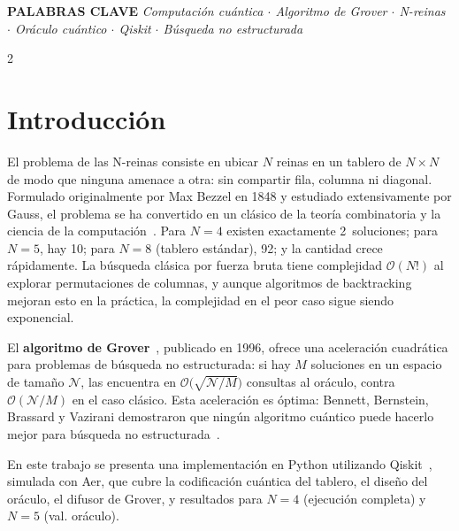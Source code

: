 \documentclass[9pt, a4paper]{extarticle}
\newcommand{\BigO}{\mathcal{O}}
\begin{document}
\vspace{0.01cm}
\noindent
\colorbox{boxbg}{%
\begin{minipage}{\dimexpr\textwidth-2\fboxsep\relax}
\vspace{2pt}
{\small\sffamily\bfseries\color{accent} PALABRAS CLAVE}\quad
{\small\itshape
Computaci\'on cu\'antica $\cdot$ Algoritmo de Grover $\cdot$ N-reinas $\cdot$
Or\'aculo cu\'antico $\cdot$ Qiskit $\cdot$ B\'usqueda no estructurada}
\vspace{2pt}
\end{minipage}}

\vspace{0.07cm}

\begin{multicols}{2}
\raggedcolumns

\section{Introducci\'on}

El problema de las N-reinas consiste en ubicar $N$ reinas en un tablero
de $N \times N$ de modo que ninguna amenace a otra: sin compartir fila,
columna ni diagonal. Formulado originalmente por Max Bezzel en 1848 y
estudiado extensivamente por Gauss, el problema se ha convertido en un
cl\'asico de la teor\'ia combinatoria y la ciencia de la
computaci\'on~\cite{nqueens}.
Para $N = 4$ existen exactamente 2~soluciones; para $N = 5$, hay 10;
para $N = 8$ (tablero est\'andar), 92; y la cantidad crece r\'apidamente.
La b\'usqueda cl\'asica por fuerza bruta tiene complejidad $\BigO(N!)$
al explorar permutaciones de columnas, y aunque algoritmos de backtracking
mejoran esto en la pr\'actica, la complejidad en el peor caso sigue siendo
exponencial.

El \textbf{algoritmo de Grover}~\cite{grover1996}, publicado en 1996,
ofrece una aceleraci\'on cuadr\'atica para problemas de b\'usqueda no
estructurada: si hay $M$ soluciones en un espacio de tama\~no $\mathcal{N}$,
las encuentra en $\BigO\!\big(\sqrt{\mathcal{N}/M}\big)$ consultas al
or\'aculo, contra $\BigO(\mathcal{N}/M)$ en el caso cl\'asico. Esta
aceleraci\'on es \'optima: Bennett, Bernstein, Brassard y Vazirani
demostraron que ning\'un algoritmo cu\'antico puede hacerlo mejor
para b\'usqueda no estructurada~\cite{bennett1997}.

En este trabajo se presenta una implementaci\'on en Python
utilizando Qiskit~\cite{qiskit}, simulada con Aer, que cubre la
codificaci\'on cu\'antica del tablero, el dise\~no del or\'aculo, el
difusor de Grover, y resultados para $N = 4$ (ejecuci\'on completa) y
$N = 5$ (val. or\'aculo).


\end{multicols}
\end{document}
